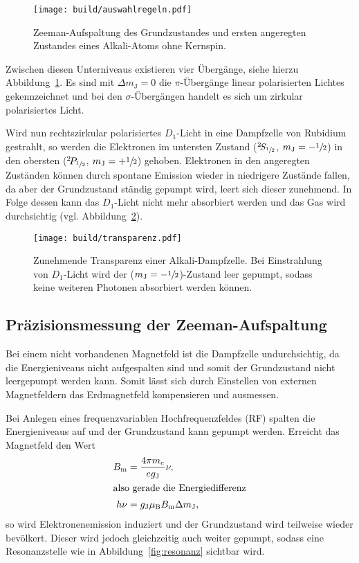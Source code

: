 \begin{figure}[ht]
  \centering
  \texttt{[image: build/auswahlregeln.pdf]}
  \caption{%
    Zeeman-Aufspaltung des Grundzustandes und ersten angeregten
  Zustandes eines Alkali-Atoms ohne Kernspin.\cite{anleitung}
  }%
  \label{fig:auswahlregeln}
\end{figure}

Zwischen diesen Unterniveaus existieren vier Übergänge, siehe hierzu
Abbildung~\ref{fig:auswahlregeln}.
Es sind mit $\Delta m_\text{J} = 0$ die $\pi$-Übergänge linear polarisierten
Lichtes gekennzeichnet und bei den $\sigma$-Übergängen handelt es sich um
zirkular polarisiertes Licht.

Wird nun rechtszirkular polarisiertes $D_1$-Licht in eine Dampfzelle von Rubidium
gestrahlt, so werden die Elektronen im untersten Zustand
(${}^2\!S_{\sfrac{1}{2}}$, $m_\text{J} = - \sfrac{1}{2}$)
in den obersten
(${}^2\!P_{\sfrac{1}{2}}$, $m_\text{J} = + \sfrac{1}{2}$)
gehoben.
Elektronen in den angeregten Zuständen können durch spontane Emission wieder
in niedrigere Zustände fallen,
da aber der Grundzustand ständig gepumpt wird,
leert sich dieser zunehmend.
In Folge dessen kann das $D_1$-Licht nicht mehr absorbiert werden und das Gas
wird durchsichtig (vgl. Abbildung~\ref{fig:transparenz}).

\begin{figure}[ht]
  \centering
  \texttt{[image: build/transparenz.pdf]}
  \caption{%
    Zunehmende Transparenz einer Alkali-Dampfzelle.\cite{anleitung}
    Bei Einstrahlung von $D_1$-Licht wird der ($m_\text{J}
    = - \sfrac{1}{2}$)-Zustand leer gepumpt, sodass keine weiteren Photonen
    absorbiert werden können.
  }
  \label{fig:transparenz}
\end{figure}




\subsection{Präzisionsmessung der Zeeman-Aufspaltung}%
\label{sub:prazisionsmessung_der_zeeman_aufspaltung}

Bei einem nicht vorhandenen Magnetfeld ist die Dampfzelle undurchsichtig,
da die Energieniveaus nicht aufgespalten sind und somit der Grundzustand nicht
leergepumpt werden kann.
Somit lässt sich durch Einstellen von externen Magnetfeldern das Erdmagnetfeld
kompensieren und ausmessen.

Bei Anlegen eines frequenzvariablen Hochfrequenzfeldes (RF) spalten die
Energieniveaus auf
und der Grundzustand kann gepumpt werden.
Erreicht das Magnetfeld den Wert
\begin{align}
  B_\text{m} &= \frac{4 \pi m_e}{e g_\text{J}} \nu, \\
  \intertext{also gerade die Energiedifferenz}
  h \nu &= g_\text{J} \mu_\text{B} B_\text{m} \Delta m_\text{J},
\end{align}
so wird Elektronenemission induziert und der Grundzustand wird teilweise wieder
bevölkert.
Dieser wird jedoch gleichzeitig auch weiter gepumpt, sodass eine
Resonanzstelle wie in Abbildung~\ref{fig:resonanz} sichtbar wird.

